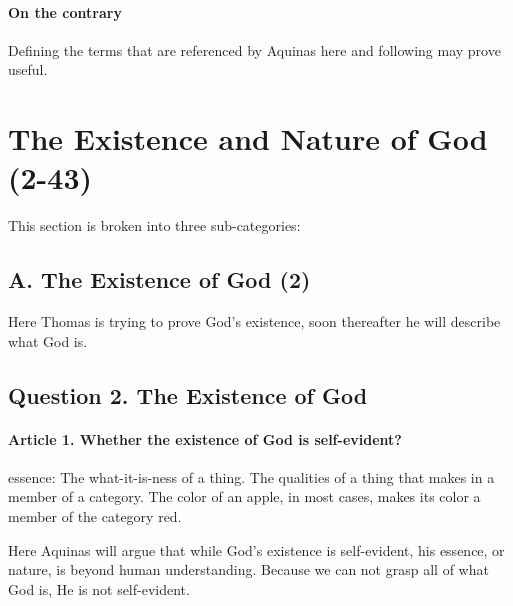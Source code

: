 \documentclass{ucetd}
\begin{document}
\paragraph{On the contrary}
Defining the terms that are referenced by Aquinas here and following may prove useful.


\clearpage

\section{The Existence and Nature of God (2-43)}
This section is broken into three sub-categories:
\subsection{A. The Existence of God (2)}
Here Thomas is trying to prove God's existence, soon thereafter he will describe what God is.
\subsection{Question 2. The Existence of God}
\paragraph{Article 1. Whether the existence of God is self-evident?}
\gls{essence}: The what-it-is-ness of a thing. The qualities of a thing that makes in a member of a category. The color of an apple, in most cases, makes its color a member of the category red.

Here Aquinas will argue that while God's existence is self-evident, his essence, or nature, is beyond human understanding. Because we can not grasp all of what God is, He is not self-evident.
\end{document}
